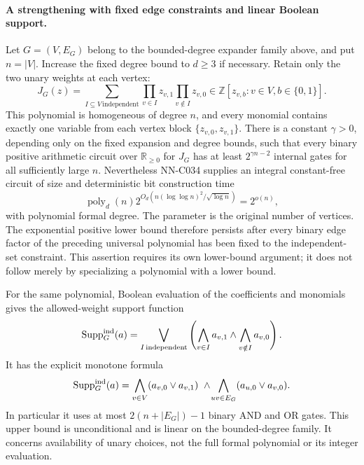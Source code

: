 \paragraph{A strengthening with fixed edge constraints and linear Boolean support.}
Let $G=(V,E_G)$ belong to the bounded-degree expander family above,
and put $n=|V|$.  Increase the fixed degree bound to $d\ge3$
if necessary.  Retain only the two unary weights at each vertex:
\[
 J_G(z)=\sum_{I\subseteq V\,\text{independent}}
            \prod_{v\in I}z_{v,1}\prod_{v\notin I}z_{v,0}
                  \in\mathbb Z[z_{v,b}:v\in V, b\in\{0,1\}].
\]
This polynomial is homogeneous of degree $n$, and every monomial
contains exactly one variable from each vertex block
$\{z_{v,0},z_{v,1}\}$.  There is a constant $\gamma>0$, depending
only on the fixed expansion and degree bounds, such that every
binary positive arithmetic circuit over $\mathbb R_{\ge0}$ for
$J_G$ has at least $2^{\gamma n-2}$ internal gates for all
sufficiently large $n$.  Nevertheless NN-C034 supplies an integral
constant-free circuit of size and deterministic bit construction time
\[
 \operatorname{poly}_d(n)
 2^{O_d(n(\log\log n)^2/\sqrt{\log n})}=2^{o(n)},
\]
with polynomial formal degree.  The parameter is the original
number of vertices.  The exponential positive lower bound therefore
persists after every binary edge factor of the preceding universal
polynomial has been fixed to the independent-set constraint.
This assertion requires its own lower-bound argument; it does not
follow merely by specializing a polynomial with a lower bound.

For the same polynomial, Boolean evaluation of the coefficients and
monomials gives the allowed-weight support function
\[
 \operatorname{Supp}^{\rm ind}_G(a)
   =\bigvee_{I\,\text{independent}}
           \left(\bigwedge_{v\in I}a_{v,1}\wedge
                 \bigwedge_{v\notin I}a_{v,0}\right).
\]
It has the explicit monotone formula
\begin{equation}\label{eq:S019-independent-support}
 \operatorname{Supp}^{\rm ind}_G(a)=
       \bigwedge_{v\in V}(a_{v,0}\vee a_{v,1})
       \ \wedge\!
       \bigwedge_{uv\in E_G}(a_{u,0}\vee a_{v,0}).
\end{equation}
In particular it uses at most $2(n+|E_G|)-1$ binary AND and OR
gates.  This upper bound is unconditional and is linear on the
bounded-degree family.  It concerns availability of unary choices,
not the full formal polynomial or its integer evaluation.

